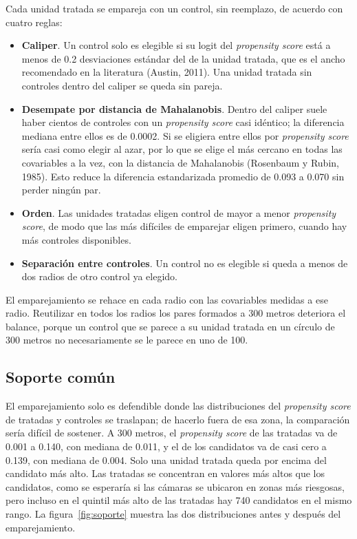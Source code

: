 \noindent Cada unidad tratada se empareja con un control, sin reemplazo, de acuerdo con cuatro reglas:

\begin{itemize}
    \item \textbf{Caliper}. Un control solo es elegible si su logit del \emph{propensity score} está a menos de 0.2 desviaciones estándar del de la unidad tratada, que es el ancho recomendado en la literatura (Austin, 2011). Una unidad tratada sin controles dentro del caliper se queda sin pareja.
    \item \textbf{Desempate por distancia de Mahalanobis}. Dentro del caliper suele haber cientos de controles con un \emph{propensity score} casi idéntico; la diferencia mediana entre ellos es de 0.0002. Si se eligiera entre ellos por \emph{propensity score} sería casi como elegir al azar, por lo que se elige el más cercano en todas las covariables a la vez, con la distancia de Mahalanobis (Rosenbaum y Rubin, 1985). Esto reduce la diferencia estandarizada promedio de 0.093 a 0.070 sin perder ningún par.
    \item \textbf{Orden}. Las unidades tratadas eligen control de mayor a menor \emph{propensity score}, de modo que las más difíciles de emparejar eligen primero, cuando hay más controles disponibles.
    \item \textbf{Separación entre controles}. Un control no es elegible si queda a menos de dos radios de otro control ya elegido.
\end{itemize}

El emparejamiento se rehace en cada radio con las covariables medidas a ese radio. Reutilizar en todos los radios los pares formados a 300 metros deteriora el balance, porque un control que se parece a su unidad tratada en un círculo de 300 metros no necesariamente se le parece en uno de 100.

\subsection{Soporte común}
\label{sec:soporte}

\noindent El emparejamiento solo es defendible donde las distribuciones del \emph{propensity score} de tratadas y controles se traslapan; de hacerlo fuera de esa zona, la comparación sería difícil de sostener. A 300 metros, el \emph{propensity score} de las tratadas va de 0.001 a 0.140, con mediana de 0.011, y el de los candidatos va de casi cero a 0.139, con mediana de 0.004. Solo una unidad tratada queda por encima del candidato más alto. Las tratadas se concentran en valores más altos que los candidatos, como se esperaría si las cámaras se ubicaron en zonas más riesgosas, pero incluso en el quintil más alto de las tratadas hay 740 candidatos en el mismo rango. La figura~\ref{fig:soporte} muestra las dos distribuciones antes y después del emparejamiento.

